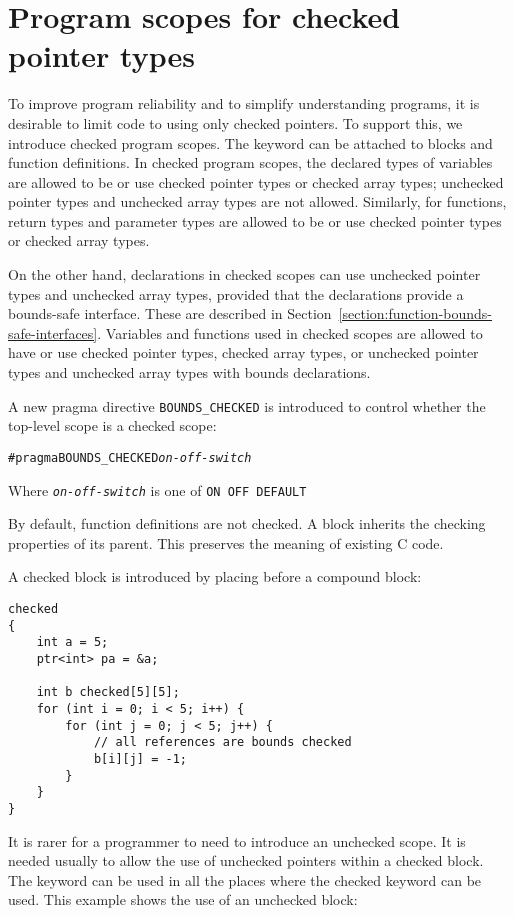 \section{Program scopes for checked pointer types}

To improve program reliability and to simplify understanding programs,
it is desirable to limit code to using only checked pointers. To support
this, we introduce checked program scopes. The  keyword
can be attached to blocks and function definitions. In checked program
scopes, the declared types of variables are allowed to be or use
checked pointer types or checked array types; unchecked pointer types
and unchecked array types are not allowed.  Similarly, for functions,
return types and parameter types are allowed to be or use checked pointer
types or checked array types.  

On the other hand,  declarations in checked scopes can use unchecked pointer
types and unchecked array types, provided that the declarations provide a
bounds-safe interface.   These are described in
Section~\ref{section:function-bounds-safe-interfaces}.
Variables and functions used in checked scopes are 
allowed to have or use checked pointer types, checked array types, or
unchecked pointer types and unchecked array types with bounds declarations.

A new pragma directive \texttt{BOUNDS\_CHECKED} is introduced to control whether
the top-level scope is a checked scope:
\begin{alltt}
#pragma BOUNDS_CHECKED \textit{on-off-switch}
\end{alltt}

Where \texttt{\textit{on-off-switch}} is one of \verb|ON OFF DEFAULT|

By default, function definitions are not checked. A block inherits the
checking properties of its parent. This preserves the meaning of
existing C code.

A checked block is introduced by placing   before a
compound block:
\begin{verbatim}
checked 
{
    int a = 5;
    ptr<int> pa = &a;

    int b checked[5][5];
    for (int i = 0; i < 5; i++) {
        for (int j = 0; j < 5; j++) {
            // all references are bounds checked
            b[i][j] = -1;
        }
    }
}
\end{verbatim}

It is rarer for a programmer to need to introduce an unchecked scope. It
is needed usually to allow the use of unchecked pointers within a checked
block. The  keyword can be used in all the places where the
checked keyword can be used. This example shows the use of an unchecked
block:

